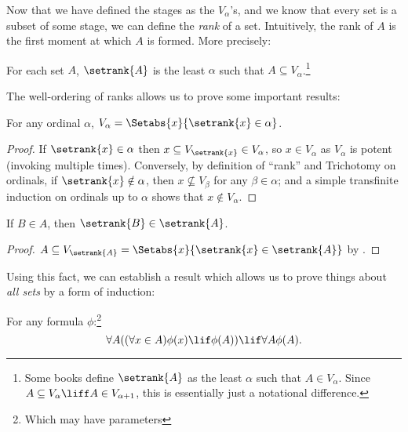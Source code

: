 \documentclass[../../../include/open-logic-section]{subfiles}
\begin{document}

Now that we have defined the stages as the $V_\alpha$'s, and we know
that every set is a subset of some stage, we can define the
\emph{rank} of a set. Intuitively, the rank of $A$ is the first moment
at which $A$ is formed. More precisely:

\begin{defn}
For each set $A$, $\setrank{A}$ is the least $\alpha$ such that $A
\subseteq V_\alpha$.\footnote{Some books define $\setrank{A}$ as the
least $\alpha$ such that $A \in V_\alpha$. Since $A \subseteq V_\alpha
\liff A \in V_{\alpha+1}$, this is essentially just a notational
difference.}
\end{defn}

The well-ordering of ranks allows us to prove some important results:
\begin{prop}
For any ordinal $\alpha$, $V_\alpha = \Setabs{x}{\setrank{x} \in \alpha}$.
\end{prop}

\begin{proof}
If $\setrank{x} \in \alpha$ then $x \subseteq V_{\setrank{x}} \in
V_\alpha$, so $x \in V_\alpha$ as $V_\alpha$ is potent (invoking
 multiple times). Conversely, by
definition of ``rank'' and Trichotomy on ordinals, if $\setrank{x}
\notin  \alpha$, then $x \nsubseteq V_\beta$ for any $\beta \in
\alpha$; and a simple transfinite induction on ordinals up to $\alpha$
shows that $x \notin V_\alpha$. 
\end{proof}

\begin{prop}
If $B \in A$, then $\setrank{B} \in \setrank{A}$.
\end{prop}

\begin{proof}
$A \subseteq V_{\setrank{A}} = \Setabs{x}{\setrank{x} \in
\setrank{A}}$ by .
\end{proof}

Using this fact, we can establish a result which allows us to prove
things about \emph{all sets} by a form of induction:

\begin{thm} 
For any formula $\phi$:\footnote{Which may have parameters}
\[
	\forall A((\forall x \in A)\phi(x) \lif \phi(A)) \lif \forall A \phi(A).
\]
\end{thm}
\end{document}
